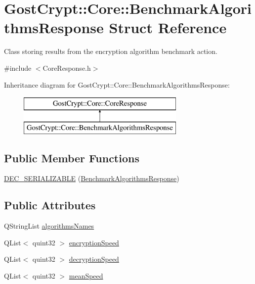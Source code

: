 \hypertarget{struct_gost_crypt_1_1_core_1_1_benchmark_algorithms_response}{}\section{Gost\+Crypt\+:\+:Core\+:\+:Benchmark\+Algorithms\+Response Struct Reference}
\label{struct_gost_crypt_1_1_core_1_1_benchmark_algorithms_response}


Class storing results from the encryption algorithm benchmark action.  




{\ttfamily \#include $<$Core\+Response.\+h$>$}

Inheritance diagram for Gost\+Crypt\+:\+:Core\+:\+:Benchmark\+Algorithms\+Response\+:\begin{figure}[H]
\begin{center}
\leavevmode
\includegraphics[height=2.000000cm]{struct_gost_crypt_1_1_core_1_1_benchmark_algorithms_response}
\end{center}
\end{figure}
\subsection*{Public Member Functions}
\begin{DoxyCompactItemize}
\item 
\hyperlink{struct_gost_crypt_1_1_core_1_1_benchmark_algorithms_response_aaa26b7a5feb4060c569987f57da943de}{D\+E\+C\+\_\+\+S\+E\+R\+I\+A\+L\+I\+Z\+A\+B\+LE} (\hyperlink{struct_gost_crypt_1_1_core_1_1_benchmark_algorithms_response}{Benchmark\+Algorithms\+Response})
\end{DoxyCompactItemize}
\subsection*{Public Attributes}
\begin{DoxyCompactItemize}
\item 
Q\+String\+List \hyperlink{struct_gost_crypt_1_1_core_1_1_benchmark_algorithms_response_a77f70eb5808611cf190e8a6a26ea0155}{algorithms\+Names}
\item 
Q\+List$<$ quint32 $>$ \hyperlink{struct_gost_crypt_1_1_core_1_1_benchmark_algorithms_response_a0f2190447d41f5c98af32c5264e21c5b}{encryption\+Speed}
\item 
Q\+List$<$ quint32 $>$ \hyperlink{struct_gost_crypt_1_1_core_1_1_benchmark_algorithms_response_a2bed026f2c08b26b2bc4097604d94da7}{decryption\+Speed}
\item 
Q\+List$<$ quint32 $>$ \hyperlink{struct_gost_crypt_1_1_core_1_1_benchmark_algorithms_response_ab066f79449c10e70cdd7142d8c16ae13}{mean\+Speed}
\end{DoxyCompactItemize}


